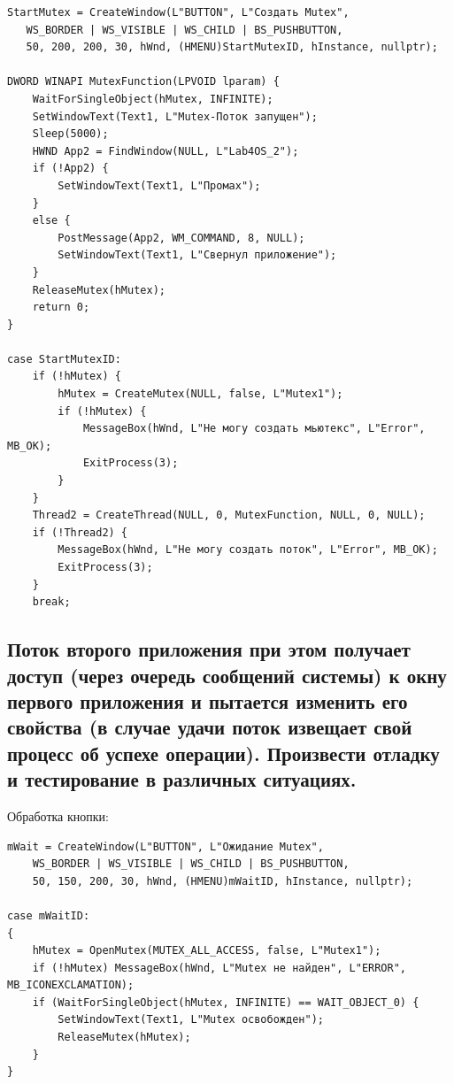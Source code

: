 \documentclass[12pt]{article}
\begin{document}
\begin{verbatim}
StartMutex = CreateWindow(L"BUTTON", L"Создать Mutex", 
   WS_BORDER | WS_VISIBLE | WS_CHILD | BS_PUSHBUTTON, 
   50, 200, 200, 30, hWnd, (HMENU)StartMutexID, hInstance, nullptr);

DWORD WINAPI MutexFunction(LPVOID lparam) {
    WaitForSingleObject(hMutex, INFINITE);
    SetWindowText(Text1, L"Mutex-Поток запущен");
    Sleep(5000);
    HWND App2 = FindWindow(NULL, L"Lab4OS_2");
    if (!App2) {
        SetWindowText(Text1, L"Промах");
    }
    else {
        PostMessage(App2, WM_COMMAND, 8, NULL);
        SetWindowText(Text1, L"Свернул приложение");
    }
    ReleaseMutex(hMutex);
    return 0;
}

case StartMutexID:
    if (!hMutex) {
        hMutex = CreateMutex(NULL, false, L"Mutex1");
        if (!hMutex) {
            MessageBox(hWnd, L"Не могу создать мьютекс", L"Error", MB_OK);
            ExitProcess(3);
        }
    }
    Thread2 = CreateThread(NULL, 0, MutexFunction, NULL, 0, NULL);
    if (!Thread2) {
        MessageBox(hWnd, L"Не могу создать поток", L"Error", MB_OK);
        ExitProcess(3);
    }
    break;
\end{verbatim}

\subsection{Поток второго приложения при этом получает доступ (через очередь сообщений системы) к окну первого приложения и пытается изменить его свойства (в случае удачи поток извещает свой процесс об успехе операции). Произвести отладку и тестирование в различных ситуациях.}
Обработка кнопки:\\
\begin{verbatim}
mWait = CreateWindow(L"BUTTON", L"Ожидание Mutex",
    WS_BORDER | WS_VISIBLE | WS_CHILD | BS_PUSHBUTTON,
    50, 150, 200, 30, hWnd, (HMENU)mWaitID, hInstance, nullptr);

case mWaitID:
{
    hMutex = OpenMutex(MUTEX_ALL_ACCESS, false, L"Mutex1");
    if (!hMutex) MessageBox(hWnd, L"Mutex не найден", L"ERROR", MB_ICONEXCLAMATION);
    if (WaitForSingleObject(hMutex, INFINITE) == WAIT_OBJECT_0) {
        SetWindowText(Text1, L"Mutex освобожден");
        ReleaseMutex(hMutex);
    }
}

\end{verbatim}
\end{document}
